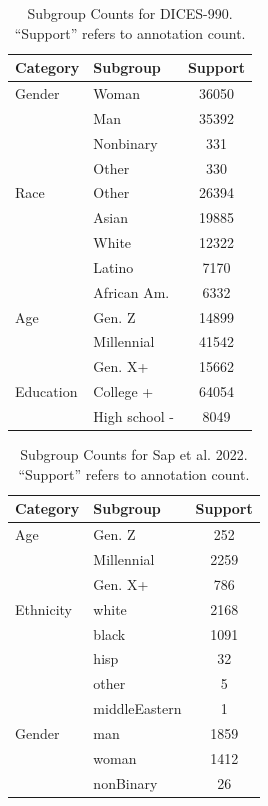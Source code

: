\documentclass[11pt]{article}
\theoremstyle{definition}
\theoremstyle{plain}
\begin{document}
\begin{table}[ht]
	\centering
	\begin{tabular}{llc}
		\toprule
		\textbf{Category} & \textbf{Subgroup} & \textbf{Support} \\
		\midrule
		Gender & Woman & 36050 \\
		& Man & 35392 \\
		& Nonbinary & 331 \\
		& Other & 330 \\
		\midrule
		Race & Other & 26394 \\
		& Asian & 19885 \\
		& White & 12322 \\
		& Latino & 7170 \\
		& African Am. & 6332 \\
		\midrule
		Age & Gen. Z & 14899 \\
		& Millennial & 41542 \\
		& Gen. X+ & 15662 \\
		\midrule
		Education & College + & 64054 \\
		& High school - & 8049 \\
		\bottomrule
	\end{tabular}
		\caption{Subgroup Counts for DICES-990. ``Support'' refers to annotation count.}
	\label{tab:dices990-stats}
\end{table}


\begin{table}[t]
	\centering
	\begin{tabular}{llc}
		\toprule
		\textbf{Category} & \textbf{Subgroup} & \textbf{Support}\\
		\midrule
		Age& Gen. Z & 252 \\
		& Millennial & 2259 \\
		& Gen. X+ & 786 \\
		\midrule
		Ethnicity & white & 2168 \\
		& black & 1091 \\
		& hisp & 32 \\
		& other & 5 \\
		& middleEastern & 1 \\
		\midrule
		Gender & man & 1859 \\
		& woman & 1412 \\
		& nonBinary & 26 \\
		\bottomrule
	\end{tabular}
		\caption{Subgroup Counts for Sap et al. 2022. ``Support'' refers to annotation count.}
	\label{tab:sap-stats}
\end{table}
\end{document}
